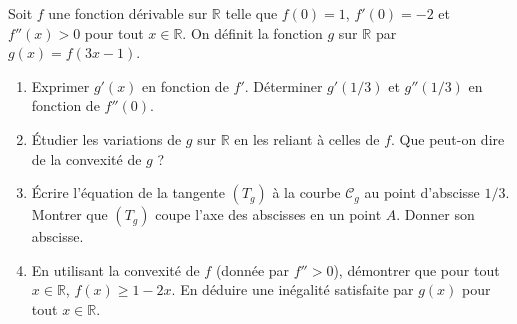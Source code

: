 \documentclass[11pt]{article}
\begin{document}
\begin{exercice}
Soit $f$ une fonction dérivable sur $\mathbb{R}$ telle que $f(0) = 1$, $f'(0) = -2$ et $f''(x) > 0$ pour tout $x \in \mathbb{R}$.
On définit la fonction $g$ sur $\mathbb{R}$ par $g(x) = f(3x - 1)$.
\begin{enumerate}
    \item Exprimer $g'(x)$ en fonction de $f'$. Déterminer $g'(1/3)$ et $g''(1/3)$ en fonction de $f''(0)$.
    \item Étudier les variations de $g$ sur $\mathbb{R}$ en les reliant à celles de $f$. Que peut-on dire de la convexité de $g$ ?
    \item Écrire l'équation de la tangente $(T_g)$ à la courbe $\mathcal{C}_g$ au point d'abscisse $1/3$. Montrer que $(T_g)$ coupe l'axe des abscisses en un point $A$. Donner son abscisse.
    \item En utilisant la convexité de $f$ (donnée par $f''>0$), démontrer que pour tout $x \in \mathbb{R}$, $f(x) \geq 1 - 2x$. En déduire une inégalité satisfaite par $g(x)$ pour tout $x \in \mathbb{R}$.
\end{enumerate}
\end{exercice}
\end{document}
